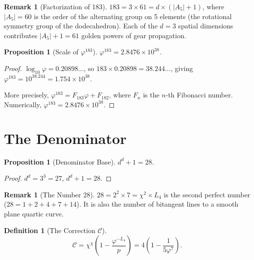 \documentclass[11pt,a4paper]{article}
\theoremstyle{plain}
\newtheorem{proposition}[theorem]{Proposition}
\theoremstyle{definition}
\newtheorem{definition}[theorem]{Definition}
\newtheorem{remark}[theorem]{Remark}
\newcommand{\vp}{\varphi}
\begin{document}
\begin{remark}[Factorization of 183]\label{rem:183}
$183 = 3 \times 61 = d \times (|A_5| + 1)$, where $|A_5| = 60$ is the
order of the alternating group on 5 elements (the rotational symmetry
group of the dodecahedron).  Each of the $d = 3$ spatial dimensions
contributes $|A_5| + 1 = 61$ golden powers of gear propagation.
\end{remark}

\begin{proposition}[Scale of $\vp^{183}$]\label{prop:phi183}
$\vp^{183} = 2.8476 \times 10^{38}$.
\end{proposition}

\begin{proof}
$\log_{10}\vp = 0.20898\ldots$, so
$183 \times 0.20898 = 38.244\ldots$, giving
$\vp^{183} = 10^{38.244} = 1.754 \times 10^{38}$.

More precisely, $\vp^{183} = F_{183}\vp + F_{182}$, where $F_n$ is the
$n$-th Fibonacci number.  Numerically, $\vp^{183} = 2.8476 \times 10^{38}$.
\end{proof}

\section{The Denominator}\label{sec:denominator}

\begin{proposition}[Denominator Base]\label{prop:denom-base}
$d^d + 1 = 28$.
\end{proposition}

\begin{proof}
$d^d = 3^3 = 27$, $d^d + 1 = 28$.
\end{proof}

\begin{remark}[The Number 28]\label{rem:28}
$28 = 2^2 \times 7 = \chi^2 \times L_4$ is the second perfect number
($28 = 1 + 2 + 4 + 7 + 14$).  It is also the number of bitangent lines
to a smooth plane quartic curve.
\end{remark}

\begin{definition}[The Correction $\mathcal{C}$]\label{def:correction}
\[
  \mathcal{C}
  = \chi^\chi \left(1 - \frac{\vp^{-L_4}}{p}\right)
  = 4\left(1 - \frac{1}{5\vp^7}\right).
\]
\end{definition}
\end{document}
